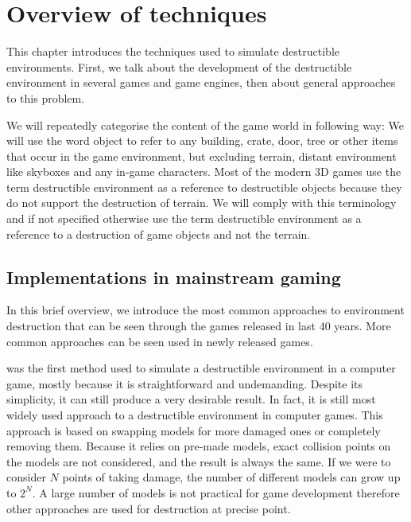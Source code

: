 \chapter{Overview of techniques}
This chapter introduces the techniques used to simulate destructible environments. First, we talk about the development of the destructible environment in several games and game engines, then about general approaches to this problem.

We will repeatedly categorise the content of the game world in following way: We will use the word object to refer to any building, crate, door, tree or other items that occur in the game environment, but excluding terrain, distant environment like skyboxes and any in-game characters. Most of the modern 3D games use the term destructible environment as a reference to destructible objects because they do not support the destruction of terrain. We will comply with this terminology and if not specified otherwise use the term destructible environment as a reference to a destruction of game objects and not the terrain.

\section{Implementations in mainstream gaming}
\label{sec:common}
In this brief overview, we introduce the most common approaches to environment destruction that can be seen through the games released in last 40 years. More common approaches can be seen used in newly released games.

 was the first method used to simulate a destructible environment in a computer game, mostly because it is straightforward and undemanding. Despite its simplicity, it can still produce a very desirable result. In fact, it is still most widely used approach to a destructible environment in computer games. This approach is based on swapping models for more damaged ones or completely removing them. Because it relies on pre-made models, exact collision points on the models are not considered, and the result is always the same. If we were to consider $N$ points of taking damage, the number of different models can grow up to $2^N$. A large number of models is not practical for game development therefore other approaches are used for destruction at precise point.

